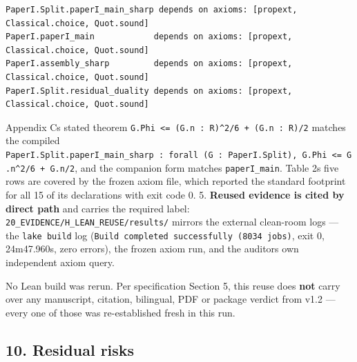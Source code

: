 \documentclass[
  9pt,
  a4paper,
]{article}
\begin{document}
\begin{verbatim}
PaperI.Split.paperI_main_sharp depends on axioms: [propext, Classical.choice, Quot.sound]
PaperI.paperI_main            depends on axioms: [propext, Classical.choice, Quot.sound]
PaperI.assembly_sharp         depends on axioms: [propext, Classical.choice, Quot.sound]
PaperI.Split.residual_duality depends on axioms: [propext, Classical.choice, Quot.sound]
\end{verbatim}

Appendix C\textquotesingle s stated theorem
\texttt{G.Phi\ \textless{}=\ (G.n\ :\ R)\^{}2/6\ +\ (G.n\ :\ R)/2}
matches the compiled
\texttt{PaperI.Split.paperI\_main\_sharp\ :\ forall\ (G\ :\ PaperI.Split),\ G.Phi\ \textless{}=\ G.n\^{}2/6\ +\ G.n/2},
and the companion form matches \texttt{paperI\_main}. Table
2\textquotesingle s five rows are covered by the frozen axiom file,
which reported the standard footprint for all 15 of its declarations
with exit code 0. 5. \textbf{Reused evidence is cited by direct path}
and carries the required label:
\texttt{20\_EVIDENCE/H\_LEAN\_REUSE/results/} mirrors the external
clean-room logs --- the \texttt{lake\ build} log
(\texttt{Build\ completed\ successfully\ (8034\ jobs)}, exit 0,
24m47.960s, zero errors), the frozen axiom run, and the
auditor\textquotesingle s own independent axiom query.

No Lean build was rerun. Per specification Section 5, this reuse does
\textbf{not} carry over any manuscript, citation, bilingual, PDF or
package verdict from v1.2 --- every one of those was re-established
fresh in this run.

\subsection{10. Residual risks}\label{10-residual-risks}
\end{document}

